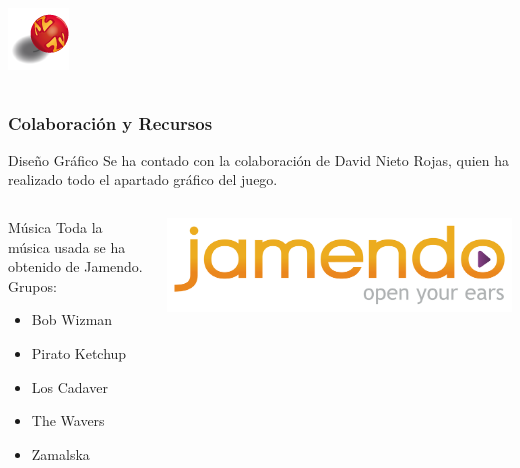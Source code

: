 \begin{frame}
\begin{columns}
        \begin{center}
                \includegraphics[scale=0.5]{imagenes/item_box.png}
        \end{center}
        
    \end{columns}

\end{frame}

\begin{frame}
    \frametitle{Colaboración y Recursos}

        \begin{block}{Diseño Gráfico}
        Se ha contado con la colaboración de David Nieto Rojas, quien ha realizado todo el apartado gráfico del juego.
        \end{block}
        
        \begin{columns}
        
            \column{150px}
            \begin{block}{Música}
            Toda la música usada se ha obtenido de Jamendo. Grupos:
                \begin{itemize}
                    \item Bob Wizman
                    \item Pirato Ketchup
                    \item Los Cadaver
                    \item The Wavers
                    \item Zamalska 
                \end{itemize}
            \end{block}
            
            \column{150px}
            \begin{center}
                    \includegraphics[scale=0.05]{imagenes/logo_jamendo.png}
            \end{center}
            
        \end{columns}

\end{frame}

